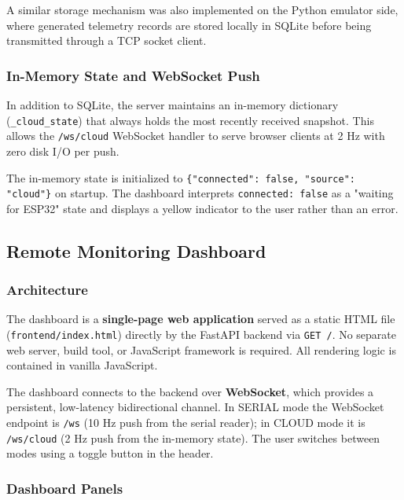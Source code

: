 A similar storage mechanism was also implemented on the Python emulator side, where generated telemetry records are stored locally in SQLite before being transmitted through a TCP socket client.

\subsubsection{In-Memory State and WebSocket Push}

In addition to SQLite, the server maintains an in-memory dictionary (\texttt{\_cloud\_state}) that always holds the most recently received snapshot. This allows the \texttt{/ws/cloud} WebSocket handler to serve browser clients at 2 Hz with zero disk I/O per push.

The in-memory state is initialized to \texttt{\{"connected": false, "source": "cloud"\}} on startup. The dashboard interprets \texttt{connected: false} as a "waiting for ESP32" state and displays a yellow indicator to the user rather than an error.

\subsection{Remote Monitoring Dashboard}

\subsubsection{Architecture}

The dashboard is a \textbf{single-page web application} served as a static HTML file (\texttt{frontend/index.html}) directly by the FastAPI backend via \texttt{GET /}. No separate web server, build tool, or JavaScript framework is required. All rendering logic is contained in vanilla JavaScript.

The dashboard connects to the backend over \textbf{WebSocket}, which provides a persistent, low-latency bidirectional channel. In SERIAL mode the WebSocket endpoint is \texttt{/ws} (10 Hz push from the serial reader); in CLOUD mode it is \texttt{/ws/cloud} (2 Hz push from the in-memory state). The user switches between modes using a toggle button in the header.

\subsubsection{Dashboard Panels}

